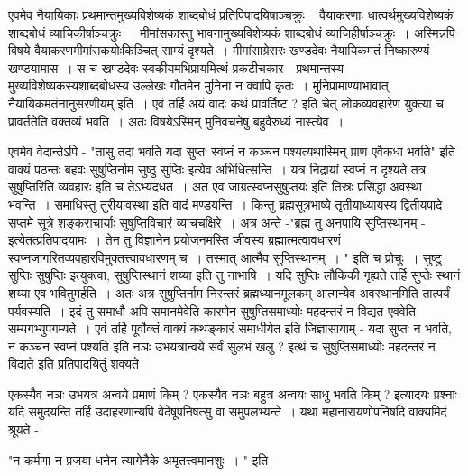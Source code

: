 {एवमेव नैयायिकाः प्रथमान्तमुख्यविशेष्यकं शाब्दबोधं प्रतिपिपादयिषाञ्चक्रुः~।\break वैयाकरणाः धात्वर्थमुख्यविशेष्यकं शाब्दबोधं व्याचिकीर्षाञ्चक्रुः~। मीमांसकास्तु भावनामुख्य\-विशेष्यकं शाब्दबोधं व्याजिहीर्षाञ्चक्रुः~। अस्मिन्नपि विषये वैयाकरणमीमांसकयोः\break किञ्चित् साम्यं दृश्यते~। मीमांसाग्रेसरः खण्डदेवः नैयायिकमतं निष्कारुण्यं खण्डयामास~। स च खण्डदेवः स्वकीयमभिप्रायमित्थं प्रकटीचकार - प्रथमान्तस्य मुख्यविशेष्यकस्य\break शाब्दबोधस्य उल्लेखः गौतमेन मुनिना न क्वापि कृतः~। मुनिप्रामाण्याभावात् नैयायिकमतं\break नानुसरणीयम् इति~। एवं तर्हि अयं वादः कथं प्रावर्तिष्ट ? इति चेत् लोकव्यवहारेण युक्त्या च प्रावर्ततेति वक्तव्यं भवति~। अतः विषयेऽस्मिन् मुनिवचनेषु बहुवैरुध्यं नास्त्येव~। 

एवमेव वेदान्तेऽपि - "तासु तदा भवति यदा सुप्तः स्वप्नं न कञ्चन पश्यत्यथास्मिन् प्राण एवैकधा भवति" इति वाक्यं पठन्तः बहवः सुषुप्तिर्नाम सुष्ठु सुप्तिः इत्येव अभिधित्सन्ति~। यत्र निद्रायां स्वप्नं न दृश्यते तत्र सुषुप्तिरिति व्यवहारः इति च तेऽभ्यदधत~। अत एव जाग्रत्स्वप्नसुषुप्तयः इति तिस्रः प्रसिद्धा अवस्था भवन्ति~। समाधिस्तु तुरीयावस्था इति वादं मण्डयन्ति~। किन्तु ब्रह्मसूत्रभाष्ये तृतीयाध्यायस्य द्वितीयपादे सप्तमे सूत्रे शङ्कराचार्याः सुषुप्तिविचारं व्याचचक्षिरे~। अत्र अन्ते -"ब्रह्म तु अनपायि सुप्तिस्थानम् - इत्येतत्प्रतिपादयामः~। तेन तु विज्ञानेन प्रयोजनमस्ति जीवस्य ब्रह्मात्मत्वावधारणं स्वप्नजागरितव्यवहारविमुक्तत्त्वावधारणम् च~। तस्मात् आत्मैव सुप्तिस्थानम्~। " इति च प्रोचुः~। सुष्टु सुप्तिः सुषुप्तिः इत्युक्त्वा, सुषुप्तिस्थानं शय्या इति तु नाभाषि~। यदि सुप्तिः लौकिकी गृह्यते तर्हि सुप्तेः स्थानं शय्या एव भवितुमर्हति~। अतः अत्र सुषुप्तिर्नाम निरन्तरं ब्रह्मध्यानमूलकम् आत्मन्येव अवस्थानमिति तात्पर्यं पर्यवस्यति~। इदं तु समाधौ अपि समानमेवेति कारणेन सुषुप्तिसमाध्योः महदन्तरं न विद्यत एववेति सम्यगभ्युपगम्यते~। एवं तर्हि पूर्वोक्तं वाक्यं कथङ्कारं समाधीयेत इति जिज्ञासायाम् - यदा सुप्तः न भवति, न कञ्चन स्वप्नं पश्यति इति नञः उभयत्रान्वये सर्वं सुलभं खलु ? इत्थं च सुषुप्तिसमाध्योः महदन्तरं न विद्यते इति प्रतिपादयितुं शक्यते~। 

एकस्यैव नञः उभयत्र अन्वये प्रमाणं किम् ? एकस्यैव नञः बहुत्र अन्वयः साधु भवति किम् ? इत्यादयः प्रश्नाः यदि समुदयन्ति तर्हि उदाहरणान्यपि वेदेषूपनिषत्सु वा समुपलभ्यन्ते~। यथा महानारायणोपनिषदि वाक्यमिदं श्रूयते - 

"न कर्मणा न प्रजया धनेन त्यागेनैके अमृतत्त्वमानशुः~। " इति

}

